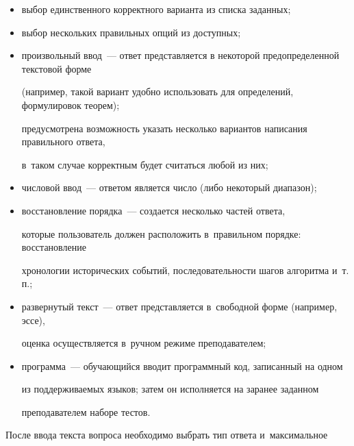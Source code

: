 \begin{itemize}


\item выбор единственного корректного варианта из списка заданных;\\[-9pt]


\item выбор нескольких правильных опций из доступных;\\[-9pt]


\item произвольный ввод~--- ответ представляется в некоторой предопределенной текстовой форме


(например, такой вариант удобно использовать для определений, формулировок теорем); 


предусмотрена возможность указать несколько вариантов написания правильного ответа, 


в~таком случае корректным будет считаться любой из них;\\[-9pt]


\item числовой ввод~--- ответом является число (либо некоторый диапазон);\\[-9pt]


\item восстановление порядка~--- создается несколько частей ответа, 


которые пользователь должен расположить в~правильном порядке: восстановление 


хронологии исторических событий, последовательности шагов алгоритма и~т.\,п.;\\[-9pt]


\item развернутый текст~---  ответ представляется в~свободной форме (например, эссе), 


оценка осуществляется в~ручном режиме преподавателем;\\[-9pt]


\item программа~--- обучающийся вводит программный код, записанный на одном 


из поддерживаемых языков; затем он исполняется на заранее заданном 


преподавателем наборе тестов.


\end{itemize}





После ввода текста вопроса необходимо выбрать тип ответа и~максимальное 


